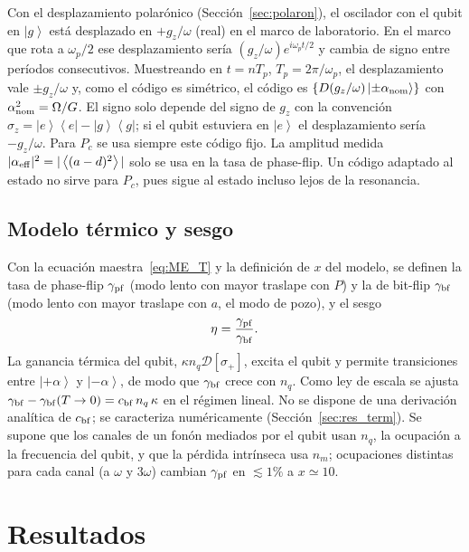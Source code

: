 \documentclass[11pt,a4paper]{article}
\newcommand{\ket}[1]{\left|#1\right\rangle}
\newcommand{\bra}[1]{\left\langle#1\right|}
\newcommand{\ave}[1]{\left\langle#1\right\rangle}
\newcommand{\spl}{\sigma_{+}}
\newcommand{\Pe}{\ket{e}\!\bra{e}}
\newcommand{\Pg}{\ket{g}\!\bra{g}}
\newcommand{\D}{\mathcal{D}}
\theoremstyle{definition}
\begin{document}
Con el desplazamiento polarónico (Sección~\ref{sec:polaron}), el oscilador con el qubit en $\ket{g}$ está desplazado en $+g_z/\omega$ (real) en el marco de laboratorio. En el marco que rota a $\omega_p/2$ ese desplazamiento sería $(g_z/\omega)e^{i\omega_pt/2}$ y cambia de signo entre períodos consecutivos. Muestreando en $t=nT_p$, $T_p=2\pi/\omega_p$, el desplazamiento vale $\pm g_z/\omega$ y, como el código es simétrico, el código es $\{D(g_z/\omega)\ket{\pm\alpha_{\rm nom}}\}$ con $\alpha_{\rm nom}^2=\Omega/G$. El signo solo depende del signo de $g_z$ con la convención $\sigma_z=\Pe-\Pg$; si el qubit estuviera en $\ket{e}$ el desplazamiento sería $-g_z/\omega$. Para $P_c$ se usa siempre este código fijo. La amplitud medida $|\alpha_{\rm eff}|^2=|\ave{(a-d)^2}|$ solo se usa en la tasa de phase-flip. Un código adaptado al estado no sirve para $P_c$, pues sigue al estado incluso lejos de la resonancia.

\subsection{Modelo térmico y sesgo}
\label{sec:term_deriv}

Con la ecuación maestra~\eqref{eq:ME_T} y la definición de $x$ del modelo, se definen la tasa de phase-flip $\gamma_{\rm pf}$ (modo lento con mayor traslape con $P$) y la de bit-flip $\gamma_{\rm bf}$ (modo lento con mayor traslape con $a$, el modo de pozo), y el sesgo
\begin{equation}
\eta=\frac{\gamma_{\rm pf}}{\gamma_{\rm bf}}.
\end{equation}
La ganancia térmica del qubit, $\kappa n_q\D[\spl]$, excita el qubit y permite transiciones entre $\ket{+\alpha}$ y $\ket{-\alpha}$, de modo que $\gamma_{\rm bf}$ crece con $n_q$. Como ley de escala se ajusta $\gamma_{\rm bf}-\gamma_{\rm bf}(T\to0)=c_{\rm bf}\,n_q\,\kappa$ en el régimen lineal. No se dispone de una derivación analítica de $c_{\rm bf}$; se caracteriza numéricamente (Sección~\ref{sec:res_term}). Se supone que los canales de un fonón mediados por el qubit usan $n_q$, la ocupación a la frecuencia del qubit, y que la pérdida intrínseca usa $n_m$; ocupaciones distintas para cada canal (a $\omega$ y $3\omega$) cambian $\gamma_{\rm pf}$ en $\lesssim1\%$ a $x\simeq10$.

\section{Resultados}
\label{sec:result}
\end{document}
